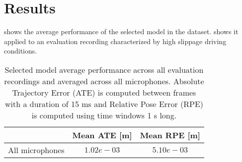 \section{Results} \label{sec:results}

 shows the average performance of the
selected model in the  dataset.
 shows it applied to an evaluation recording characterized
by high slippage driving conditions.

\begin{table}
    \centering
    \begin{tabular}{|c|c|c|}
        \hline
                        & Mean ATE [m] & Mean RPE [m] \\ \hline
        All microphones & $1.02e-03$   & $5.10e-03$     \\
        \hline
    \end{tabular}
    \caption[Selected model average performance across evaluation recordings
        and microphones]{Selected model average performance across all
        evaluation recordings and averaged across all microphones. Absolute
        Trajectory Error (ATE) is computed between frames with a duration of
        15 ms and Relative Pose Error (RPE) \cite{Measuring2019} is computed
        using time windows 1 s long.}
    \label{table:results-selected-model}
\end{table}


\begin{figure*}
    \centering
\end{figure*}


